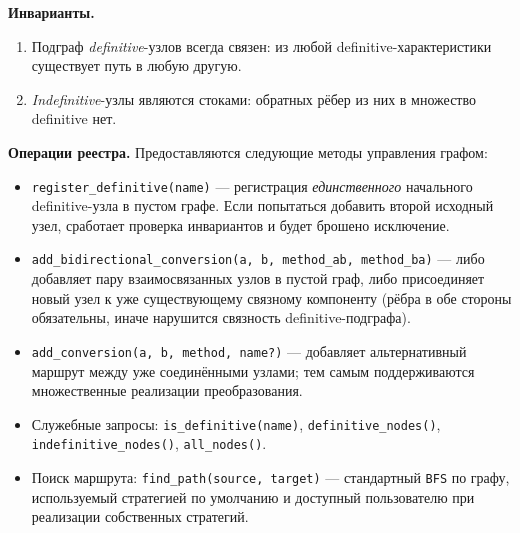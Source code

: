 \textbf{Инварианты.}
\begin{enumerate}
  \item Подграф \emph{definitive}-узлов всегда связен: из любой definitive-характеристики существует путь в любую другую.
  \item \emph{Indefinitive}-узлы являются стоками: обратных рёбер из них в множество definitive нет.
\end{enumerate}

\textbf{Операции реестра.}
Предоставляются следующие методы управления графом:
\begin{itemize}
  \item \texttt{register\_definitive(name)} — регистрация \emph{единственного} начального definitive-узла в пустом графе. Если попытаться добавить второй исходный узел, сработает проверка инвариантов и будет брошено исключение.
  \item \texttt{add\_bidirectional\_conversion(a, b, method\_ab, method\_ba)} — либо добавляет пару взаимосвязанных узлов в пустой граф, либо присоединяет новый узел к уже существующему связному компоненту (рёбра в обе стороны обязательны, иначе нарушится связность definitive-подграфа).
  \item \texttt{add\_conversion(a, b, method, name?)} — добавляет альтернативный маршрут между уже соединёнными узлами; тем самым поддерживаются множественные реализации преобразования.
  \item Служебные запросы: \texttt{is\_definitive(name)}, \texttt{definitive\_nodes()}, \texttt{indefinitive\_nodes()}, \texttt{all\_nodes()}.
  \item Поиск маршрута: \texttt{find\_path(source, target)} — стандартный \texttt{BFS} по графу, используемый стратегией по умолчанию и доступный пользователю при реализации собственных стратегий.
\end{itemize}

